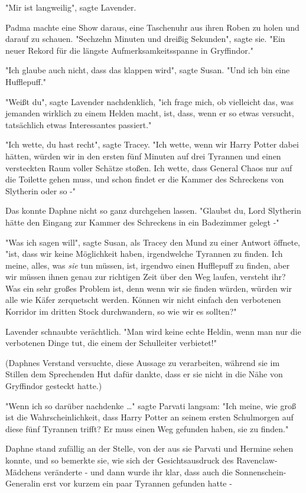 {"Mir ist langweilig", sagte Lavender.

Padma machte eine Show daraus, eine Taschenuhr aus ihren Roben zu holen und darauf zu schauen. "Sechzehn Minuten und dreißig Sekunden", sagte sie. "Ein neuer Rekord für die längste Aufmerksamkeitsspanne in Gryffindor."

"Ich glaube auch nicht, dass das klappen wird", sagte Susan. "Und ich bin eine Hufflepuff."

"Weißt du", sagte Lavender nachdenklich, "ich frage mich, ob vielleicht das, was jemanden wirklich zu einem Helden macht, ist, dass, wenn er so etwas versucht, tatsächlich etwas Interessantes passiert."

"Ich wette, du hast recht", sagte Tracey. "Ich wette, wenn wir Harry Potter dabei hätten, würden wir in den ersten fünf Minuten auf drei Tyrannen und einen versteckten Raum voller Schätze stoßen. Ich wette, dass General Chaos nur auf die Toilette gehen muss, und schon findet er die Kammer des Schreckens von Slytherin oder so -"

Das konnte Daphne nicht so ganz durchgehen lassen. "Glaubst du, Lord Slytherin hätte den Eingang zur Kammer des Schreckens in ein Badezimmer gelegt -"

"Was ich sagen will", sagte Susan, als Tracey den Mund zu einer Antwort öffnete, "ist, dass wir keine Möglichkeit haben, irgendwelche Tyrannen zu finden. Ich meine, alles, was \emph{sie} tun müssen, ist, irgendwo einen Hufflepuff zu finden, aber wir müssen ihnen genau zur richtigen Zeit über den Weg laufen, versteht ihr? Was ein sehr großes Problem ist, denn wenn wir sie finden würden, würden wir alle wie Käfer zerquetscht werden. Können wir nicht einfach den verbotenen Korridor im dritten Stock durchwandern, so wie wir es sollten?"

Lavender schnaubte verächtlich. "Man wird keine echte Heldin, wenn man nur die verbotenen Dinge tut, die einem der Schulleiter verbietet!"

(Daphnes Verstand versuchte, diese Aussage zu verarbeiten, während sie im Stillen dem Sprechenden Hut dafür dankte, dass er sie nicht in die Nähe von Gryffindor gesteckt hatte.)

"Wenn ich so darüber nachdenke …" sagte Parvati langsam: "Ich meine, wie groß ist die Wahrscheinlichkeit, dass Harry Potter an seinem ersten Schulmorgen auf diese fünf Tyrannen trifft? Er muss einen Weg gefunden haben, sie zu finden."

Daphne stand zufällig an der Stelle, von der aus sie Parvati und Hermine sehen konnte, und so bemerkte sie, wie sich der Gesichtsausdruck des Ravenclaw-Mädchens veränderte - und dann wurde ihr klar, dass auch die Sonnenschein-Generalin erst vor kurzem ein paar Tyrannen gefunden hatte -

}
